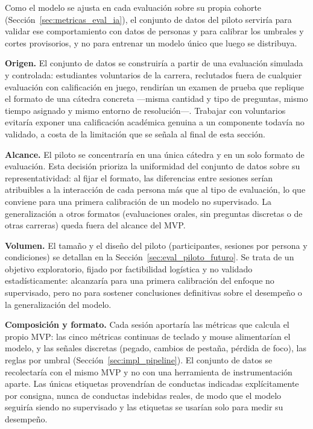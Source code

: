 Como el modelo se ajusta en cada evaluación sobre su propia cohorte (Sección~\ref{sec:metricas_eval_ia}), el conjunto de datos del piloto serviría para validar ese comportamiento con datos de personas y para calibrar los umbrales y cortes provisorios, y no para entrenar un modelo único que luego se distribuya.

\textbf{Origen.} El conjunto de datos se construiría a partir de una evaluación simulada y controlada: estudiantes voluntarios de la carrera, reclutados fuera de cualquier evaluación con calificación en juego, rendirían un examen de prueba que replique el formato de una cátedra concreta ---misma cantidad y tipo de preguntas, mismo tiempo asignado y mismo entorno de resolución---. Trabajar con voluntarios evitaría exponer una calificación académica genuina a un componente todavía no validado, a costa de la limitación que se señala al final de esta sección.

\textbf{Alcance.} El piloto se concentraría en una única cátedra y en un solo formato de evaluación. Esta decisión prioriza la uniformidad del conjunto de datos sobre su representatividad: al fijar el formato, las diferencias entre sesiones serían atribuibles a la interacción de cada persona más que al tipo de evaluación, lo que conviene para una primera calibración de un modelo no supervisado. La generalización a otros formatos (evaluaciones orales, sin preguntas discretas o de otras carreras) queda fuera del alcance del MVP.

\textbf{Volumen.} El tamaño y el diseño del piloto (participantes, sesiones por persona y condiciones) se detallan en la Sección~\ref{sec:eval_piloto_futuro}. Se trata de un objetivo exploratorio, fijado por factibilidad logística y no validado estadísticamente: alcanzaría para una primera calibración del enfoque no supervisado, pero no para sostener conclusiones definitivas sobre el desempeño o la generalización del modelo.

\textbf{Composición y formato.} Cada sesión aportaría las métricas que calcula el propio MVP: las cinco métricas continuas de teclado y mouse alimentarían el modelo, y las señales discretas (pegado, cambios de pestaña, pérdida de foco), las reglas por umbral (Sección~\ref{sec:impl_pipeline}). El conjunto de datos se recolectaría con el mismo MVP y no con una herramienta de instrumentación aparte. Las únicas etiquetas provendrían de conductas indicadas explícitamente por consigna, nunca de conductas indebidas reales, de modo que el modelo seguiría siendo no supervisado y las etiquetas se usarían solo para medir su desempeño.

